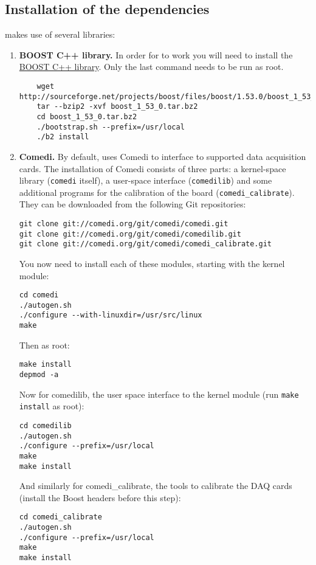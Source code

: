 \subsection{Installation of the dependencies}
\label{install:required}
\progname makes use of several libraries:
\begin{enumerate}
\item \textbf{BOOST C++ library.}
  In order for \progname to work you will need to install the
  \href{http://www.boost.org}{BOOST C++ library}. Only the last
  command needs to be run as root.
  \begin{lstlisting}
    wget http://sourceforge.net/projects/boost/files/boost/1.53.0/boost_1_53_0.tar.bz2
    tar --bzip2 -xvf boost_1_53_0.tar.bz2
    cd boost_1_53_0.tar.bz2
    ./bootstrap.sh --prefix=/usr/local
    ./b2 install
  \end{lstlisting}
\item \textbf{Comedi.}
By default, \progname uses Comedi to interface to supported data
acquisition cards. The installation of Comedi consists of three parts:
a kernel-space library (\texttt{comedi} itself), a user-space
interface (\texttt{comedilib}) and some additional programs for the
calibration of the board (\texttt{comedi\_calibrate}). They can be
downloaded from the following Git repositories:
\begin{lstlisting}
git clone git://comedi.org/git/comedi/comedi.git
git clone git://comedi.org/git/comedi/comedilib.git
git clone git://comedi.org/git/comedi/comedi_calibrate.git
\end{lstlisting}
You now need to install each of these modules, starting with the kernel module:
\begin{lstlisting}
cd comedi
./autogen.sh
./configure --with-linuxdir=/usr/src/linux
make
\end{lstlisting}
Then as root:
\begin{lstlisting}
make install
depmod -a
\end{lstlisting}
Now for comedilib, the user space interface to the kernel module (run \texttt{make install} as root):
\begin{lstlisting}
cd comedilib
./autogen.sh
./configure --prefix=/usr/local
make
make install
\end{lstlisting}
And similarly for comedi\_calibrate, the tools to calibrate the DAQ cards (install the Boost headers before this step):
\begin{lstlisting}
cd comedi_calibrate
./autogen.sh
./configure --prefix=/usr/local
make
make install
\end{lstlisting}

\end{enumerate}
